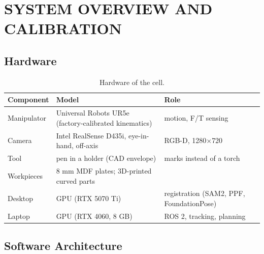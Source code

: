 \chapter{SYSTEM OVERVIEW AND CALIBRATION}
\label{chp:system}

\section{Hardware}
\label{sec:sys_hardware}
\begin{table}[htbp]
\caption{Hardware of the cell.}
\label{tab:hardware}
\centering\small
\begin{tabular}{@{}lll@{}}
\toprule
Component & Model & Role \\
\midrule
Manipulator & Universal Robots UR5e (factory-calibrated kinematics) & motion, F/T sensing \\
Camera & Intel RealSense D435i, eye-in-hand, off-axis & RGB-D, 1280$\times$720 \\
Tool & pen in a holder (CAD envelope) & marks instead of a torch \\
Workpieces & 8 mm MDF plates; 3D-printed curved parts & \\
Desktop & GPU (RTX 5070 Ti) & registration (SAM2, PPF, FoundationPose) \\
Laptop & GPU (RTX 4060, 8 GB) & ROS 2, tracking, planning \\
\bottomrule
\end{tabular}
\end{table}

\section{Software Architecture}
\label{sec:sys_software}

